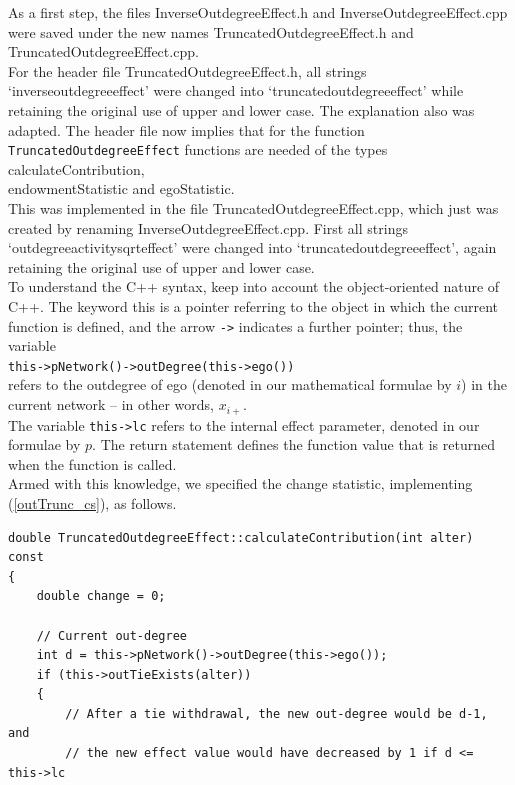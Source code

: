 \documentclass[a4paper,fleqn,11pt]{article}
\newcommand{\+}{\, + \,}
\newcommand{\sfn}[1]{\textsf{#1}}
\begin{document}
\begin{enumerate}
      As a first step,   the files \textsf{InverseOutdegreeEffect.h} and
      \textsf{InverseOutdegreeEffect.cpp} were saved under the new names
      \textsf{TruncatedOutdegreeEffect.h} and
      \textsf{TruncatedOutdegreeEffect.cpp}.
      \\
      For the header file \textsf{TruncatedOutdegreeEffect.h}, all strings
      `inverseoutdegreeeffect'
      were changed into `truncatedoutdegreeeffect' while retaining the original
      use of upper and lower case.
      The explanation also was adapted.
      The header file now implies that for the function
      \texttt{TruncatedOutdegreeEffect}
      functions are needed of the types \sfn{calculateContribution},\\
      \sfn{endowmentStatistic} and \sfn{egoStatistic}.
      \\
      This was implemented in the file \textsf{TruncatedOutdegreeEffect.cpp},
      which just was created by renaming \textsf{InverseOutdegreeEffect.cpp}.
      First  all strings `outdegreeactivitysqrteffect'
      were changed into `truncatedoutdegreeeffect', again retaining the original
      use of upper and lower case.\\
      To understand the C++ syntax, keep into account
      the object-oriented nature of C++.
      The keyword \sfn{this} is a pointer referring to the object
      in which the current function is defined, and the arrow \texttt{->}
      indicates a further pointer; thus, the variable\\
      \texttt{this->pNetwork()->outDegree(this->ego())}\\
      refers to the outdegree of ego (denoted in our mathematical
      formulae by $i$) in the current network -- in other words,
      $x_{i+}$.\\
      The variable \texttt{this->lc} refers to the
      internal effect parameter, denoted in our formulae by $p$.
      The \sfn{return} statement defines the function value that is returned
      when the function is called.
      \\
      Armed with this knowledge, we specified the change statistic,
      implementing (\ref{outTrunc_cs}), as follows.

{\small
\begin{verbatim}
double TruncatedOutdegreeEffect::calculateContribution(int alter) const
{
    double change = 0;

    // Current out-degree
    int d =	this->pNetwork()->outDegree(this->ego());
    if (this->outTieExists(alter))
    {
        // After a tie withdrawal, the new out-degree would be d-1, and
        // the new effect value would have decreased by 1 if d <= this->lc


\end{verbatim}}
\end{enumerate}
\end{document}
